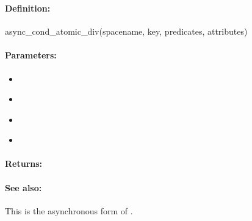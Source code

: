 \pagebreak
\subsubsection{}
\label{api:ruby:async_cond_atomic_div}


\paragraph{Definition:}
\begin{rubycode}
async_cond_atomic_div(spacename, key, predicates, attributes)
\end{rubycode}

\paragraph{Parameters:}
\begin{itemize}[noitemsep]
\item {}\\

\item {}\\

\item {}\\

\item {}\\

\end{itemize}

\paragraph{Returns:}


\paragraph{See also:}  This is the asynchronous form of .

\pagebreak
\subsubsection{}
\label{api:ruby:group_atomic_div}


